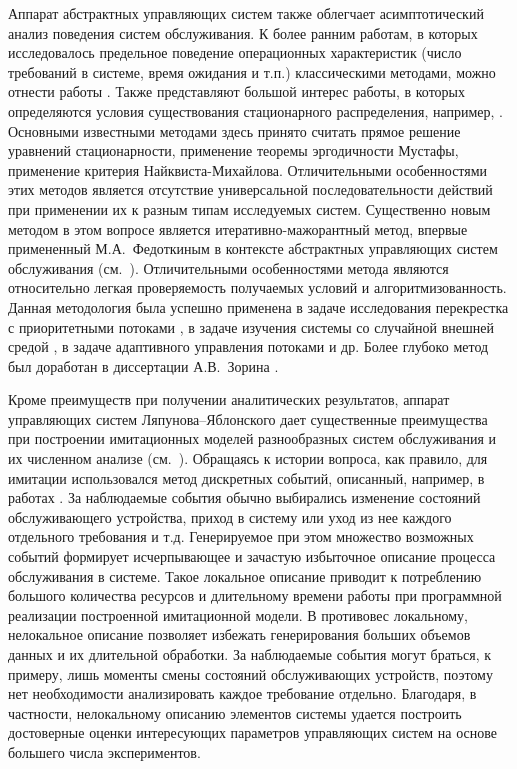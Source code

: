 Аппарат абстрактных управляющих систем также облегчает асимптотический анализ поведения систем обслуживания. К более ранним работам, в которых исследовалось предельное поведение операционных характеристик (число требований в системе, время ожидания и т.п.) классическими методами, можно отнести работы \cite{Davis:1995, Borovrkov:1964, Borovrkov:1980, Afanasieva:2011,Afanasieva:2008, Whitt:1971, Whitt:1982}. Также представляют большой интерес работы, в которых определяются условия существования стационарного распределения, например, \cite{Loynes:1962, Davis:1972, Whitt:2014, Choudhury:1995}. Основными известными методами здесь принято считать прямое решение уравнений стационарности, применение теоремы эргодичности Мустафы, применение критерия Найквиста-Михайлова. Отличительными особенностями этих методов является отсутствие универсальной последовательности действий при применении их к разным типам исследуемых систем. Существенно новым методом в этом вопросе является итеративно-мажорантный метод, впервые примененный М.А.~Федоткиным в контексте абстрактных управляющих систем обслуживания (см.~\cite{Fedotkin:1988, Fedotkin:1989}). Отличительными особенностями метода являются относительно легкая проверяемость получаемых условий и алгоритмизованность. Данная методология была успешно применена в задаче исследования перекрестка с приоритетными потоками \cite{Proidakova:2007}, в задаче изучения системы со случайной внешней средой \cite{Zorin:2008:1}, в задаче адаптивного управления потоками \cite{LitvakDissertation} и др. Более глубоко метод был доработан в диссертации А.В.~Зорина \cite{ZorineDissertation}. 

Кроме преимуществ при получении аналитических результатов, аппарат управляющих систем Ляпунова--Яблонского дает существенные преимущества  при построении имитационных моделей разнообразных систем обслуживания и их численном анализе (см.~\cite{Zorine:2013}). Обращаясь к истории вопроса, как правило, для имитации использовался метод дискретных событий, описанный, например, в работах \cite{Simulation, AsmussenGlynn, FedotkinRachinskaya:2016, FedotkinADissertation}. За наблюдаемые события обычно выбирались изменение состояний обслуживающего устройства, приход в систему или уход из нее каждого отдельного требования и т.д. Генерируемое при этом множество возможных событий формирует исчерпывающее и зачастую избыточное описание процесса обслуживания в системе. Такое локальное описание приводит к потреблению большого количества ресурсов и длительному времени работы при программной реализации построенной имитационной модели. В противовес локальному, нелокальное описание позволяет избежать генерирования больших объемов данных и их длительной обработки. За наблюдаемые события могут браться, к примеру, лишь моменты смены состояний обслуживающих устройств, поэтому нет необходимости анализировать каждое требование отдельно. Благодаря, в частности, нелокальному описанию элементов системы удается построить достоверные оценки интересующих параметров управляющих систем на основе большего числа экспериментов.




